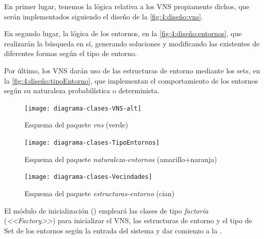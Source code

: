En primer lugar, tenemos la lógica relativa a los VNS propiamente dichos, que serán implementados siguiendo el diseño de la \autoref{fig:4:diseño:vns}.

En segundo lugar, la lógica de los entornos, en la \autoref{fig:4:diseño:entornos}, que realizarán la búsqueda en sí, generando soluciones y modificando las existentes de diferentes formas según el tipo de entorno.

%
%
%
Por último, los VNS darán uso de las estructuras de entorno mediante los sets, en la \autoref{fig:4:diseño:tipoEntorno}, que implementan el comportamiento de los entornos según su naturaleza probabilística o determinista.

\begin{figure}[htbp]
	\centering
	\texttt{[image: diagrama-clases-VNS-alt]}
	\caption{Esquema del paquete \textit{vns} (verde)}
	\label{fig:4:diseño:vns}
\end{figure}

\begin{figure}[htbp]
	\centering
	\texttt{[image: diagrama-clases-TipoEntornos]}
	\caption{Esquema del paquete \textit{naturaleza-entornos} (amarillo+naranja)}
	\label{fig:4:diseño:tipoEntorno}
\end{figure}

\begin{figure}[htbp]
	\centering
	\texttt{[image: diagrama-clases-Vecindades]}
	\caption{Esquema del paquete \textit{estructuras-entorno} (cian)}
	\label{fig:4:diseño:entornos}
\end{figure}

El módulo de inicialización (\faseuno{}) empleará las clases de tipo \textit{factoría} (\textit{<<Factory>>}) para inicializar el VNS, las estructuras de entorno y el tipo de Set de los entornos según la entrada del sistema y dar comienzo a la \faseuno{}.

